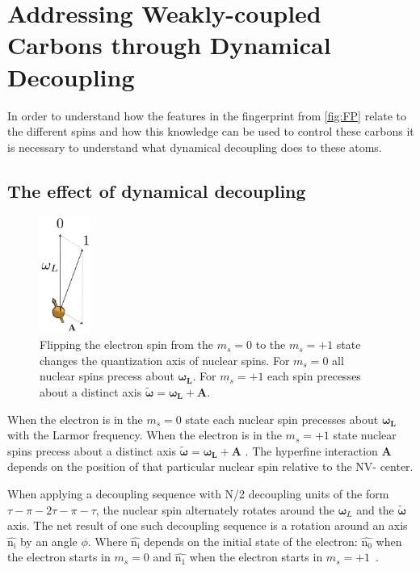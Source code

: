 \section{Addressing Weakly-coupled Carbons through Dynamical Decoupling}
\label{sec:controllingacarbonthroughdynamicaldecoupling}

In order to understand how the features in the fingerprint from \cref{fig:FP} relate to the different spins and how this knowledge can be used to control these carbons it is necessary to understand what dynamical decoupling does to these atoms.

\subsection{The effect of dynamical decoupling}

\begin{figure}[htbp]
\centering
\includegraphics[keepaspectratio,width=0.15\textwidth]{./img/QuantizationAxis.png}
\caption{Flipping the electron spin from the  $m_s=0$ to the $m_s= +1$ state changes the quantization axis of nuclear spins. For  $m_s=0$ all nuclear spins precess about $\bm{\omega_L}$. For  $m_s=+1$ each spin precesses about a distinct axis $\bm{\tilde{\omega}}=\bm{\omega_L} +\bm{A}$.}
\label{fig:quantax}
\end{figure}

When the electron is in the $m_s=0$ state each nuclear spin precesses about $\bm{\omega_L}$ with the Larmor frequency. When the electron is in the $m_s=+1$ state nuclear spins precess about a distinct axis $\bm{\tilde{\omega}}=\bm{\omega_L} +\bm{A}$ \citep{Taminiau2012Detection}. The hyperfine interaction $\bm{A}$ depends on the position of that particular nuclear spin relative to the NV- center.

When applying a decoupling sequence with N\slash 2 decoupling units of the form {$\tau - \pi -2\tau-\pi-\tau$}, the nuclear spin alternately rotates around the  $\bm\omega_L$ and the $\bm{\tilde{\omega}}$ axis.
The net result of one such decoupling sequence is a rotation around an axis $\bm{\hat{\mathrm{n_i}}}$ by an angle $\phi$.
Where $\bm{\hat{\mathrm{n_i}}}$ depends on the initial state of the electron: $\bm{\hat{\mathrm{n_0}}}$ when the electron starts in $m_s = 0$ and $\bm{\hat{\mathrm{n_1}}}$ when the electron starts in $m_s = +1$~\citep{Taminiau2012Detection}.

